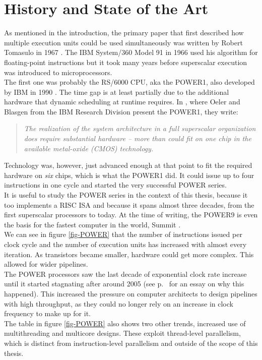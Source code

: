 \documentclass[12pt,a4paper]{article} %
\begin{document}
\section{History and State of the Art}
As mentioned in the introduction, the primary paper that first described how multiple execution units could be used simultaneously was written by Robert Tomasulo in 1967 \cite{tomasulo}. The IBM System/360 Model 91 in 1966 used his algorithm for floating-point instructions but it took many years before superscalar execution was introduced to microprocessors.\\
The first one was probably the RS/6000 CPU, aka the POWER1, also developed by IBM in 1990 \cite{power1}. The time gap is at least partially due to the additional hardware that dynamic scheduling at runtime requires. In \cite{power1}, where Oeler and Blasgen from the IBM Research Division present the POWER1, they write:
\begin{quote}
	\textit{The realization of the system architecture in a full superscalar organization does require substantial hardware -- more than could fit on one chip in the available metal-oxide (CMOS) technology.}
\end{quote}
Technology was, however, just advanced enough at that point to fit the required hardware on \textit{six} chips, which is what the POWER1 did. It could issue up to four instructions in one cycle and started the very successful POWER series. \\
It is useful to study the POWER series in the context of this thesis, because it too implements a RISC ISA and because it spans almost three decades, from the first superscalar processors to today. At the time of writing, the POWER9 is even the basis for the fastest computer in the world, Summit \cite{top500}. \\
We can see in figure \ref{fig-POWER} that the number of instructions issued per clock cycle and the number of execution units has increased with almost every iteration. As transistors became smaller, hardware could get more complex. This allowed for wider pipelines.\\
The POWER processors saw the last decade of exponential clock rate increase until it started stagnating after around 2005 (see p.~\pageref{sec-physicallimits} for an essay on why this happened). This increased the pressure on computer architects to design pipelines with high throughput, as they could no longer rely on an increase in clock frequency to make up for it. \\
The table in figure \ref{fig-POWER} also shows two other trends, increased use of multithreading and multicore designs. These exploit thread-level parallelism, which is distinct from instruction-level parallelism and outside of the scope of this thesis.\\
\end{document}
